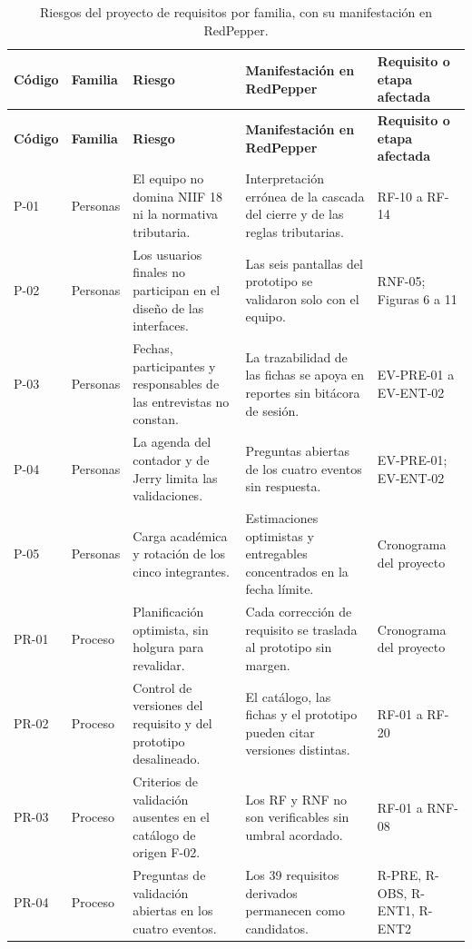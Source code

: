 {\footnotesize\setlength{\tabcolsep}{3pt}
\begin{longtable}{L{1.3cm} L{1.7cm} L{4.2cm} L{5.4cm} L{2.3cm}}
\caption{Riesgos del proyecto de requisitos por familia, con su
manifestación en RedPepper.}
\label{tab:riesgos-familias}\\
\toprule
\textbf{Código} & \textbf{Familia} & \textbf{Riesgo} & \textbf{Manifestación en RedPepper} & \textbf{Requisito o etapa afectada} \\
\midrule
\endfirsthead
\toprule
\textbf{Código} & \textbf{Familia} & \textbf{Riesgo} & \textbf{Manifestación en RedPepper} & \textbf{Requisito o etapa afectada} \\
\midrule
\endhead
\bottomrule
\endfoot
P-01 & Personas & El equipo no domina NIIF 18 ni la normativa tributaria. & Interpretación errónea de la cascada del cierre y de las reglas tributarias. & RF-10 a RF-14 \\
P-02 & Personas & Los usuarios finales no participan en el diseño de las interfaces. & Las seis pantallas del prototipo se validaron solo con el equipo. & RNF-05; Figuras 6 a 11 \\
P-03 & Personas & Fechas, participantes y responsables de las entrevistas no constan. & La trazabilidad de las fichas se apoya en reportes sin bitácora de sesión. & EV-PRE-01 a EV-ENT-02 \\
P-04 & Personas & La agenda del contador y de Jerry limita las validaciones. & Preguntas abiertas de los cuatro eventos sin respuesta. & EV-PRE-01; EV-ENT-02 \\
P-05 & Personas & Carga académica y rotación de los cinco integrantes. & Estimaciones optimistas y entregables concentrados en la fecha límite. & Cronograma del proyecto \\
PR-01 & Proceso & Planificación optimista, sin holgura para revalidar. & Cada corrección de requisito se traslada al prototipo sin margen. & Cronograma del proyecto \\
PR-02 & Proceso & Control de versiones del requisito y del prototipo desalineado. & El catálogo, las fichas y el prototipo pueden citar versiones distintas. & RF-01 a RF-20 \\
PR-03 & Proceso & Criterios de validación ausentes en el catálogo de origen F-02. & Los RF y RNF no son verificables sin umbral acordado. & RF-01 a RNF-08 \\
PR-04 & Proceso & Preguntas de validación abiertas en los cuatro eventos. & Los 39 requisitos derivados permanecen como candidatos. & R-PRE, R-OBS, R-ENT1, R-ENT2 \\

\end{longtable}}
